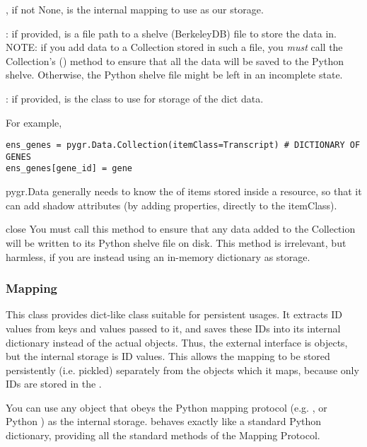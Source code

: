 \documentclass{howto}
\begin{document}
, if not None, is the internal mapping to use as our storage.

: if provided, is a file path to a shelve (BerkeleyDB) file to
  store the data in.  NOTE: if you add data to a Collection stored in such a file,
you {\em must} call the Collection's () method to ensure
that all the data will be saved to the Python shelve.  Otherwise, the 
Python shelve file might be left in an incomplete state.
   
: if provided, is the class to use for storage of the dict data.

For example,
\begin{verbatim}
ens_genes = pygr.Data.Collection(itemClass=Transcript) # DICTIONARY OF GENES
ens_genes[gene_id] = gene
\end{verbatim}
pygr.Data generally needs to know the  of items stored
inside a resource, so that it can add shadow attributes (by adding properties,
directly to the itemClass).

\begin{funcdesc}{close}{}
  You must call this method to ensure that any data added to the Collection
  will be written to its Python shelve file on disk.
  This method is irrelevant, but harmless,
  if you are instead using an in-memory dictionary as storage.
\end{funcdesc}

\subsubsection{Mapping}
This class provides dict-like class suitable for persistent usages.  
It extracts ID values from
keys and values passed to it, and saves these IDs into its internal dictionary
instead of the actual objects.  Thus, the external interface is objects,
but the internal storage is ID values.  This allows the mapping to be stored
persistently (i.e. pickled) separately from the objects which it maps, 
because only IDs are stored in the .

You can use any object that obeys the
Python mapping protocol (e.g. , or Python ) 
as the internal storage.   behaves exactly like a standard
Python dictionary, providing all the standard methods of the Mapping Protocol.
\end{document}
